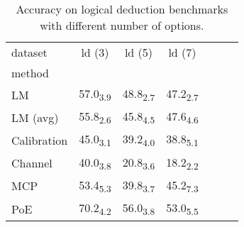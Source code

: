 \begin{table}[h]
\centering
\caption{Accuracy on logical deduction benchmarks with different number of options.}
\label{tab:num_option}
\begin{tabular}{lcccccc}
dataset & ld (3) & ld (5) & ld (7) \\
method &  &  &  \\
LM & 57.0\textsubscript{3.9} & 48.8\textsubscript{2.7} & 47.2\textsubscript{2.7} \\
LM (avg) & 55.8\textsubscript{2.6} & 45.8\textsubscript{4.5} & 47.6\textsubscript{4.6} \\
Calibration & 45.0\textsubscript{3.1} & 39.2\textsubscript{4.0} & 38.8\textsubscript{5.1} \\
Channel & 40.0\textsubscript{3.8} & 20.8\textsubscript{3.6} & 18.2\textsubscript{2.2} \\
MCP & 53.4\textsubscript{5.3} & 39.8\textsubscript{3.7} & 45.2\textsubscript{7.3} \\
PoE & 70.2\textsubscript{4.2} & 56.0\textsubscript{3.8} & 53.0\textsubscript{5.5} \\
\end{tabular}
\end{table}
